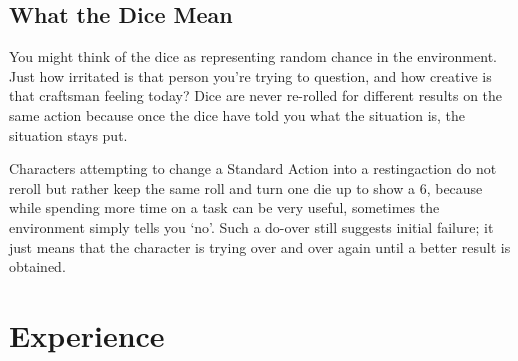 \begin{multicols}{2}
\subsection{What the Dice Mean}

You might think of the dice as representing random chance in the environment. Just how irritated is that person you're trying to question, and how creative is that craftsman feeling today? Dice are never re-rolled for different results on the same action because once the dice have told you what the situation is, the situation stays put.

Characters attempting to change a Standard Action into a \gls{restingaction} do not reroll but rather keep the same roll and turn one die up to show a 6, because while spending more time on a task can be very useful, sometimes the environment simply tells you `no'.
Such a do-over still suggests initial failure; it just means that the character is trying over and over again until a better result is obtained.

\end{multicols}

\section{Experience}
\label{xp}

